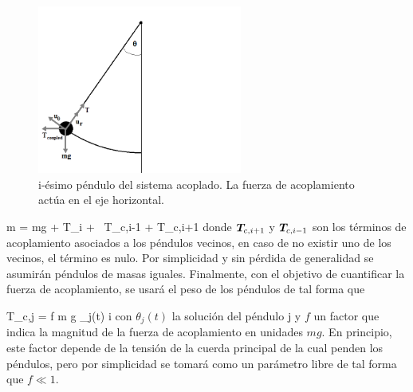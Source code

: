 \begin{figure}[htbp]
	\centering
	\includegraphics[width=0.60\textwidth]
	{./pictures/acopled_individual_pendulum.png}

	\caption{\small{i-ésimo péndulo del sistema acoplado. La fuerza de 
	acoplamiento actúa en el eje horizontal.}}
	
	\label{fig:i_pendulum}
\end{figure}


{m = m\bds g + \bds T_i + \
\bds T_{c,i-1} + \bds T_{c,i+1}}
donde $\boldsymbol{ T }_{c,i+1}$ y $\boldsymbol{ T }_{c,i-1}$ son los términos de acoplamiento
asociados a los péndulos vecinos, en caso de no existir uno de los vecinos,
el término es nulo. Por simplicidad y sin pérdida de generalidad se asumirán 
péndulos de masas iguales. Finalmente, con el objetivo de cuantificar la 
fuerza de acoplamiento, se usará el peso de los péndulos de tal forma que 


{\bds T_{c,j} = f m g \theta_j(t) \bds i}
con $\theta_j(t)$ la solución del péndulo j y $f$ un factor que indica la 
magnitud de la fuerza de acoplamiento en unidades $mg$. En principio, este
factor depende de la tensión de la cuerda principal de la cual penden los
péndulos, pero por simplicidad se tomará como un parámetro libre de tal 
forma que $f \ll 1$. 

